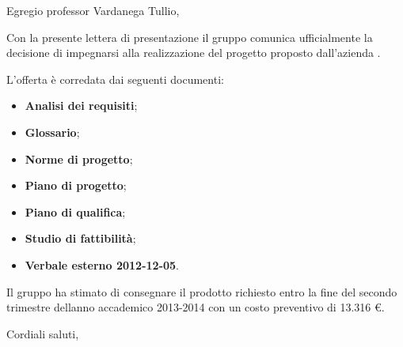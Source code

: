 





Egregio professor Vardanega Tullio,

Con la presente lettera di presentazione il gruppo \GroupName{} comunica ufficialmente la decisione di impegnarsi alla realizzazione del progetto \ProjectName{} proposto dall'azienda \Proponente{}.

L'offerta è corredata dai seguenti documenti:

\begin{itemize}

	\item \textbf{Analisi dei requisiti};
	\item \textbf{Glossario};
	\item \textbf{Norme di progetto};
	\item \textbf{Piano di progetto};
	\item \textbf{Piano di qualifica};
	\item \textbf{Studio di fattibilità};
	\item \textbf{Verbale esterno 2012-12-05}.

\end{itemize}

Il gruppo \GroupName{} ha stimato di consegnare il prodotto richiesto entro la fine del secondo trimestre dellanno accademico 2013-2014 con un costo preventivo di 13.316 €.

Cordiali saluti,

\textit{\Responsabile{}}

\appendix
%


